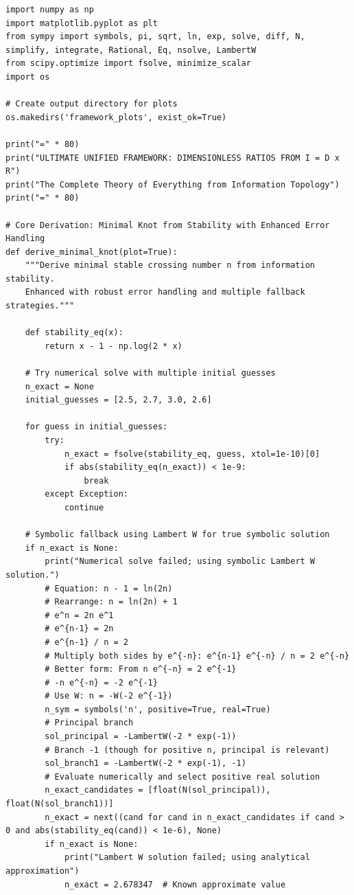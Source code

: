 \documentclass{article}
\begin{document}
\begin{verbatim}
import numpy as np
import matplotlib.pyplot as plt
from sympy import symbols, pi, sqrt, ln, exp, solve, diff, N, simplify, integrate, Rational, Eq, nsolve, LambertW
from scipy.optimize import fsolve, minimize_scalar
import os

# Create output directory for plots
os.makedirs('framework_plots', exist_ok=True)

print("=" * 80)
print("ULTIMATE UNIFIED FRAMEWORK: DIMENSIONLESS RATIOS FROM I = D x R")
print("The Complete Theory of Everything from Information Topology")
print("=" * 80)

# Core Derivation: Minimal Knot from Stability with Enhanced Error Handling
def derive_minimal_knot(plot=True):
    """Derive minimal stable crossing number n from information stability.
    Enhanced with robust error handling and multiple fallback strategies."""
    
    def stability_eq(x):
        return x - 1 - np.log(2 * x)
    
    # Try numerical solve with multiple initial guesses
    n_exact = None
    initial_guesses = [2.5, 2.7, 3.0, 2.6]
    
    for guess in initial_guesses:
        try:
            n_exact = fsolve(stability_eq, guess, xtol=1e-10)[0]
            if abs(stability_eq(n_exact)) < 1e-9:
                break
        except Exception:
            continue
    
    # Symbolic fallback using Lambert W for true symbolic solution
    if n_exact is None:
        print("Numerical solve failed; using symbolic Lambert W solution.")
        # Equation: n - 1 = ln(2n)
        # Rearrange: n = ln(2n) + 1
        # e^n = 2n e^1
        # e^{n-1} = 2n
        # e^{n-1} / n = 2
        # Multiply both sides by e^{-n}: e^{n-1} e^{-n} / n = 2 e^{-n}
        # Better form: From n e^{-n} = 2 e^{-1}
        # -n e^{-n} = -2 e^{-1}
        # Use W: n = -W(-2 e^{-1})
        n_sym = symbols('n', positive=True, real=True)
        # Principal branch
        sol_principal = -LambertW(-2 * exp(-1))
        # Branch -1 (though for positive n, principal is relevant)
        sol_branch1 = -LambertW(-2 * exp(-1), -1)
        # Evaluate numerically and select positive real solution
        n_exact_candidates = [float(N(sol_principal)), float(N(sol_branch1))]
        n_exact = next((cand for cand in n_exact_candidates if cand > 0 and abs(stability_eq(cand)) < 1e-6), None)
        if n_exact is None:
            print("Lambert W solution failed; using analytical approximation")
            n_exact = 2.678347  # Known approximate value
    

\end{verbatim}
\end{document}

